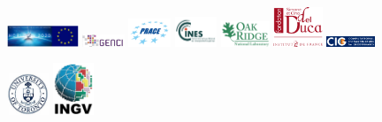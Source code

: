 \documentclass[oneside,english]{book}
\begin{document}
\begin{figure}[htbp]
%
\noindent \begin{centering}
\includegraphics[width=0.190\textwidth]{figures/logo_European_Union}\vspace*{2truemm}
\includegraphics[width=0.112\textwidth]{figures/logo_GENCI}\vspace*{2truemm}
\includegraphics[width=0.112\textwidth]{figures/logo_PRACE}\vspace*{2truemm}
\includegraphics[width=0.112\textwidth]{figures/logo_CINES}\vspace*{2truemm}
\includegraphics[width=0.130\textwidth]{figures/logo_Oak_Ridge}\vspace*{2truemm}
\hspace*{3mm}\includegraphics[width=0.130\textwidth]{figures/logo_fondation_Del_Duca}
\includegraphics[width=0.130\textwidth]{figures/logo_CIG}\vspace*{2truemm}
\par\end{centering}
%
\vspace*{-2truemm}
%
\noindent \begin{centering}
\includegraphics[width=0.112\textwidth]{figures/logo_University_of_Toronto}\vspace*{2truemm}
\includegraphics[width=0.109\textwidth]{figures/logo_INGV}\vspace*{2truemm}

\end{centering}
\end{figure}
\end{document}
